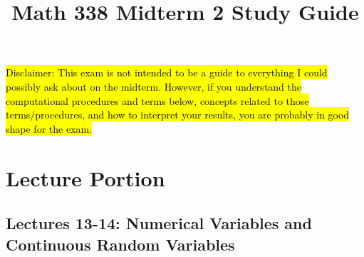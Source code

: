 \documentclass[11pt]{article} %
\title{Math 338 Midterm 2 Study Guide}
\date{}
\begin{document}
\maketitle

\hl{Disclaimer: This exam is not intended to be a guide to everything I could possibly ask about on the midterm. However, if you understand the computational procedures and terms below, concepts related to those terms/procedures, and how to interpret your results, you are probably in good shape for the exam.}


\newpage

\section{Lecture Portion}

\subsection{Lectures 13-14: Numerical Variables and Continuous Random Variables}
\end{document}
